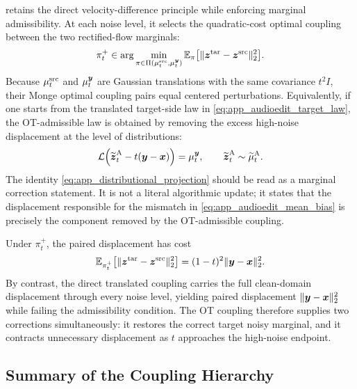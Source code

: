 \methodplus retains the direct velocity-difference principle while enforcing marginal admissibility.
At each noise level, it selects the quadratic-cost optimal coupling between the two rectified-flow marginals:
\begin{equation}
    \label{eq:app_audioeditplus_ot}
    \pi_t^{+}
    \in
    \arg\min_{\pi\in\Pi(\mu_t^{\mathrm{src}},\mu_t^{\boldsymbol{y}})}
    \mathbb{E}_{\pi}
    \big[
    \|\boldsymbol{z}^{\mathrm{tar}}-\boldsymbol{z}^{\mathrm{src}}\|_2^2
    \big].
\end{equation}
Because $\mu_t^{\mathrm{src}}$ and $\mu_t^{\boldsymbol{y}}$ are Gaussian translations with the same covariance $t^2I$, their Monge optimal coupling pairs equal centered perturbations.
Equivalently, if one starts from the translated target-side law in \eqref{eq:app_audioedit_target_law}, the OT-admissible law is obtained by removing the excess high-noise displacement at the level of distributions:
\begin{equation}
    \label{eq:app_distributional_projection}
    \mathcal{L}\!\left(
    \widetilde{\boldsymbol{z}}^{\mathrm{A}}_t
    -
    t(\boldsymbol{y}-\boldsymbol{x})
    \right)
    =
    \mu_t^{\boldsymbol{y}},
    \qquad
    \widetilde{\boldsymbol{z}}^{\mathrm{A}}_t
    \sim
    \widetilde{\mu}^{\mathrm{A}}_t.
\end{equation}
The identity \eqref{eq:app_distributional_projection} should be read as a marginal correction statement.
It is not a literal algorithmic update; it states that the displacement responsible for the mismatch in \eqref{eq:app_audioedit_mean_bias} is precisely the component removed by the OT-admissible coupling.

Under $\pi_t^{+}$, the paired displacement has cost
\begin{equation}
    \label{eq:app_plus_pair_cost}
    \mathbb{E}_{\pi_t^{+}}
    \big[
    \|\boldsymbol{z}^{\mathrm{tar}}-\boldsymbol{z}^{\mathrm{src}}\|_2^2
    \big]
    =
    (1-t)^2\|\boldsymbol{y}-\boldsymbol{x}\|_2^2.
\end{equation}
By contrast, the direct translated coupling carries the full clean-domain displacement through every noise level, yielding paired displacement $\|\boldsymbol{y}-\boldsymbol{x}\|_2^2$ while failing the admissibility condition.
The OT coupling therefore supplies two corrections simultaneously: it restores the correct target noisy marginal, and it contracts unnecessary displacement as $t$ approaches the high-noise endpoint.

\subsection{Summary of the Coupling Hierarchy}

